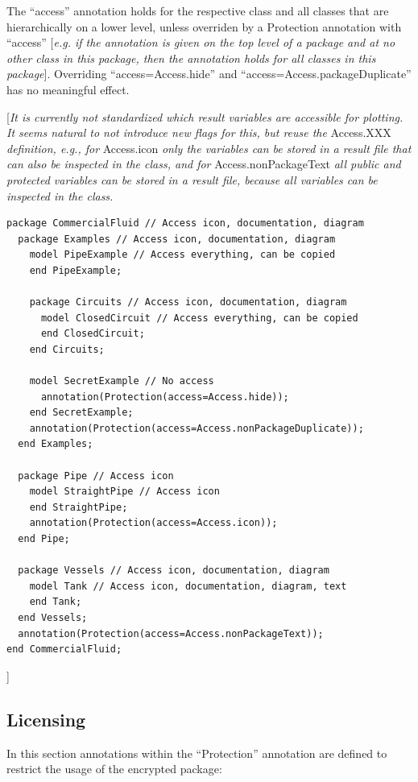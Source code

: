 \documentclass[10pt,a4paper]{report}
\def\doublelabel#1{\label{#1}}
\begin{document}
The ``access'' annotation holds for the respective class and all classes
that are hierarchically on a lower level, unless overriden by a
Protection annotation with ``access'' {[}\emph{e.g. if the annotation is
given on the top level of a package and at no other class in this
package, then the annotation holds for all classes in this package}{]}.
Overriding ``access=Access.hide'' and ``access=Access.packageDuplicate''
has no meaningful effect.

{[}\emph{It is currently not standardized which result variables are
accessible for plotting. It seems natural to not introduce new flags for
this, but reuse the} Access.XXX \emph{definition, e.g., for} Access.icon
\emph{only the variables can be stored in a result file that can also be
inspected in the class, and for} Access.nonPackageText \emph{all public
and protected variables can be stored in a result file, because all
variables can be inspected in the class.}

\begin{lstlisting}[language=modelica]
package CommercialFluid // Access icon, documentation, diagram
  package Examples // Access icon, documentation, diagram
    model PipeExample // Access everything, can be copied
    end PipeExample;

    package Circuits // Access icon, documentation, diagram
      model ClosedCircuit // Access everything, can be copied
      end ClosedCircuit;
    end Circuits;

    model SecretExample // No access
      annotation(Protection(access=Access.hide));
    end SecretExample;
    annotation(Protection(access=Access.nonPackageDuplicate));
  end Examples;

  package Pipe // Access icon
    model StraightPipe // Access icon
    end StraightPipe;
    annotation(Protection(access=Access.icon));
  end Pipe;

  package Vessels // Access icon, documentation, diagram
    model Tank // Access icon, documentation, diagram, text
    end Tank;
  end Vessels;
  annotation(Protection(access=Access.nonPackageText));
end CommercialFluid;
\end{lstlisting}
{]}

\subsection{Licensing}\doublelabel{licensing}

In this section annotations within the ``Protection'' annotation are
defined to restrict the usage of the encrypted package:
\end{document}
